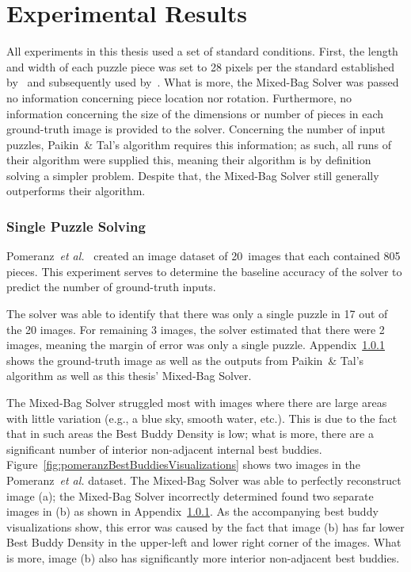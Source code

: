 \chapter{Experimental Results}

All experiments in this thesis used a set of standard conditions.  First, the length and width of each puzzle piece was set to 28 pixels per the standard established by~\cite{cho2010} and subsequently used by~\cite{pomeranz2011, gallagher2012, sholomon2013, paikin2015}. What is more, the Mixed-Bag Solver was passed no information concerning piece location nor rotation.  Furthermore, no information concerning the size of the dimensions or number of pieces in each ground-truth image is provided to the solver.  Concerning the number of input puzzles, Paikin~\& Tal's algorithm requires this information; as such, all runs of their algorithm were supplied this, meaning their algorithm is by definition solving a simpler problem.  Despite that, the Mixed-Bag Solver still generally outperforms their algorithm.

\subsection{Single Puzzle Solving}

Pomeranz~\textit{et al.}~\cite{pomeranzBenchmarkImages} created an image dataset of 20~images that each contained 805 pieces.  This experiment serves to determine the baseline accuracy of the solver to predict the number of ground-truth inputs.  

The solver was able to identify that there was only a single puzzle in 17 out of the 20 images.  For remaining 3 images, the solver estimated that there were 2 images, meaning the margin of error was only a single puzzle.  Appendix~\ref{} shows the ground-truth image as well as the outputs from Paikin~\& Tal's algorithm as well as this thesis' Mixed-Bag Solver.  

The Mixed-Bag Solver struggled most with images where there are large areas with little variation (e.g., a blue sky, smooth water, etc.).  This is due to the fact that in such areas the Best Buddy Density is low; what is more, there are a significant number of interior non-adjacent internal best buddies.  Figure~\ref{fig:pomeranzBestBuddiesVisualizations} shows two images in the Pomeranz~\textit{et al.} dataset.  The Mixed-Bag Solver was able to perfectly reconstruct image (a); the Mixed-Bag Solver incorrectly determined found two separate images in (b) as shown in Appendix~\ref{}.  As the accompanying best buddy visualizations show, this error was caused by the fact that image (b) has far lower Best Buddy Density in the upper-left and lower right corner of the images.  What is more, image (b) also has significantly more interior non-adjacent best buddies. 

